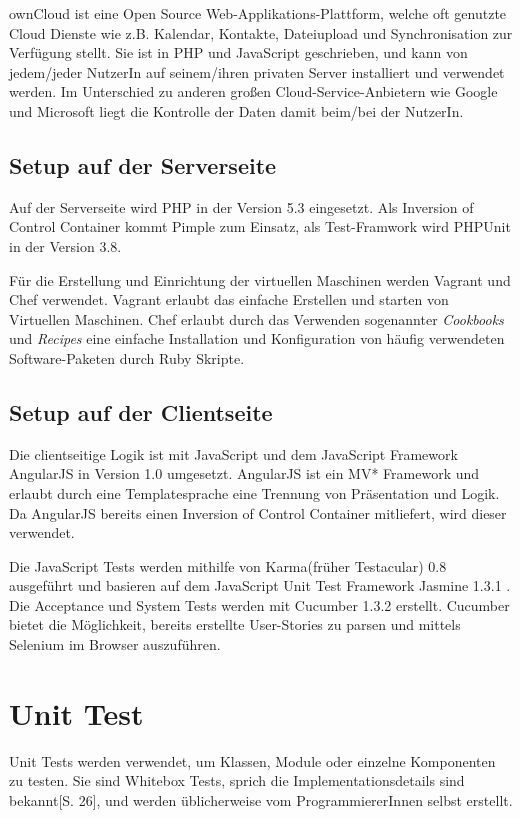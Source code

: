 \documentclass[a4paper,bibtotoc,oneside]{scrbook}
\begin{document}
ownCloud ist eine Open Source Web-Applikations-Plattform, welche oft genutzte Cloud Dienste wie z.B. Kalendar, Kontakte, Dateiupload und Synchronisation zur Verfügung stellt. Sie ist in PHP und JavaScript geschrieben, und kann von jedem/jeder NutzerIn auf seinem/ihren privaten Server installiert und verwendet werden. Im Unterschied zu anderen großen Cloud-Service-Anbietern wie Google und Microsoft liegt die Kontrolle der Daten damit beim/bei der NutzerIn.

\section{Setup auf der Serverseite}
Auf der Serverseite wird PHP in der Version 5.3 eingesetzt. Als Inversion of Control Container kommt Pimple\cite{pimple} zum Einsatz, als Test-Framwork wird PHPUnit\cite{phpunit} in der Version 3.8.

Für die Erstellung und Einrichtung der virtuellen Maschinen werden Vagrant\cite{vagrant} und Chef\cite{chef} verwendet. Vagrant erlaubt das einfache Erstellen und starten von Virtuellen Maschinen. Chef erlaubt durch das Verwenden sogenannter \emph{Cookbooks} und \emph{Recipes} eine einfache Installation und Konfiguration von häufig verwendeten Software-Paketen durch Ruby Skripte.

\section{Setup auf der Clientseite}
Die clientseitige Logik ist mit JavaScript und dem JavaScript Framework AngularJS\cite{angular} in Version 1.0 umgesetzt. AngularJS ist ein MV* Framework und erlaubt durch eine Templatesprache eine Trennung von Präsentation und Logik. Da AngularJS bereits einen Inversion of Control Container mitliefert, wird dieser verwendet.

Die JavaScript Tests werden mithilfe von Karma\cite{karma}(früher Testacular) 0.8 ausgeführt und basieren auf dem JavaScript Unit Test Framework Jasmine 1.3.1 \cite{jasmine}. Die Acceptance und System Tests werden mit Cucumber 1.3.2 \cite{cucumber} erstellt. Cucumber bietet die Möglichkeit, bereits erstellte User-Stories zu parsen und mittels Selenium im Browser auszuführen.


\chapter{Unit Test}
Unit Tests werden verwendet, um Klassen, Module oder einzelne Komponenten zu testen. Sie sind Whitebox Tests, sprich die Implementationsdetails sind bekannt\cite{betrieb}[S. 26], und werden üblicherweise vom ProgrammiererInnen selbst erstellt.
\end{document}
